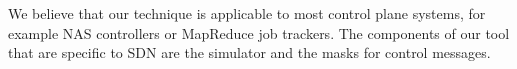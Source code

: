 We believe that our technique is applicable to most control plane systems,
for example NAS controllers or MapReduce job trackers. The components of our
tool that are specific to SDN are the simulator and the masks for control
messages.


